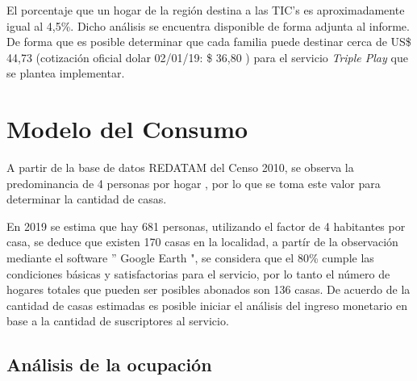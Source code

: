 El porcentaje que un hogar de la región destina a las TIC's es aproximadamente igual al 4,5\%. Dicho análisis se encuentra disponible de forma adjunta al informe. De forma que es posible determinar que cada familia puede destinar cerca de US\$ 44,73 (cotización oficial dolar 02/01/19: \$ 36,80 ) para el servicio \textit{Triple Play} que se plantea implementar.


\section{Modelo del Consumo}

 
A partir de la base de datos REDATAM del Censo 2010, se observa la predominancia de 4 personas por hogar \cite{censo2010-personas}, por lo que se toma este valor para determinar la cantidad de casas.


En 2019 se estima que hay 681 personas, utilizando el factor de 4 habitantes por casa, se deduce que existen 170 casas en la localidad, a partír de la observación mediante el software '' Google Earth ", se considera que el 80\% cumple las condiciones básicas y satisfactorias para el servicio, por lo tanto el número de hogares totales que pueden ser posibles abonados son 136 casas. De acuerdo de la cantidad de casas estimadas es posible iniciar el análisis del ingreso monetario en base a la cantidad de suscriptores al servicio.



\subsection{Análisis de la ocupación}






